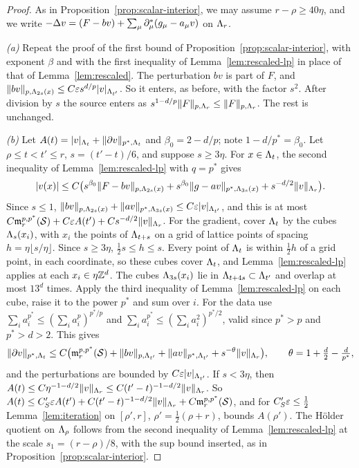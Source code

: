 \begin{proof}
As in Proposition~\ref{prop:scalar-interior}, we may assume $r-\rho\ge40\eta$, and we write $-\Delta v=(F-bv)+\sum_\mu\partial^*_\mu(g_\mu-a_\mu v)$ on $\Lambda_r$.

\emph{(a)} Repeat the proof of the first bound of Proposition~\ref{prop:scalar-interior}, with exponent $\beta$ and with the first inequality of Lemma~\ref{lem:rescaled-lp} in place of that of Lemma~\ref{lem:rescaled}. The perturbation $bv$ is part of $F$, and $\|bv\|_{p,\Lambda_{2s}(x)}\le C\varepsilon s^{d/p}|v|_{\Lambda_{t'}}$. So it enters, as before, with the factor $s^2$. After division by $s$ the source enters as $s^{1-d/p}\|F\|_{p,\Lambda_r}\le\|F\|_{p,\Lambda_r}$. The rest is unchanged.

\emph{(b)} Let $A(t)=|v|_{\Lambda_t}+\|\partial v\|_{p^*,\Lambda_t}$ and $\beta_0=2-d/p$; note $1-d/p^*=\beta_0$. Let $\rho\le t<t'\le r$, $s=(t'-t)/6$, and suppose $s\ge3\eta$. For $x\in\Lambda_t$, the second inequality of Lemma~\ref{lem:rescaled-lp} with $q=p^*$ gives
\[
|v(x)|\le C\big(s^{\beta_0}\|F-bv\|_{p,\Lambda_{2s}(x)}+s^{\beta_0}\|g-av\|_{p^*,\Lambda_{3s}(x)}+s^{-d/2}\|v\|_{\Lambda_r}\big).
\]
Since $s\le1$, $\|bv\|_{p,\Lambda_{2s}(x)}+\|av\|_{p^*,\Lambda_{3s}(x)}\le C\varepsilon|v|_{\Lambda_{t'}}$, and this is at most $C\mathfrak m^{p,p^*}_r(\mathcal S)+C\varepsilon A(t')+Cs^{-d/2}\|v\|_{\Lambda_r}$. For the gradient, cover $\Lambda_t$ by the cubes $\Lambda_s(x_i)$, with $x_i$ the points of $\Lambda_{t+s}$ on a grid of lattice points of spacing $h=\eta\lfloor s/\eta\rfloor$. Since $s\ge3\eta$, $\frac12s\le h\le s$. Every point of $\Lambda_t$ is within $\frac12h$ of a grid point, in each coordinate, so these cubes cover $\Lambda_t$, and Lemma~\ref{lem:rescaled-lp} applies at each $x_i\in\eta\mathbb Z^d$. The cubes $\Lambda_{3s}(x_i)$ lie in $\Lambda_{t+4s}\subset\Lambda_{t'}$ and overlap at most $13^d$ times. Apply the third inequality of Lemma~\ref{lem:rescaled-lp} on each cube, raise it to the power $p^*$ and sum over $i$. For the data use $\sum_ia_i^{p^*}\le(\sum_ia_i^p)^{p^*/p}$ and $\sum_ia_i^{p^*}\le(\sum_ia_i^2)^{p^*/2}$, valid since $p^*>p$ and $p^*>d>2$. This gives
\[
\|\partial v\|_{p^*,\Lambda_t}\le C\big(\mathfrak m^{p,p^*}_r(\mathcal S)+\|bv\|_{p,\Lambda_{t'}}+\|av\|_{p^*,\Lambda_{t'}}+s^{-\theta}\|v\|_{\Lambda_r}\big),\qquad\theta=1+\tfrac d2-\tfrac d{p^*},
\]
and the perturbations are bounded by $C\varepsilon|v|_{\Lambda_{t'}}$. If $s<3\eta$, then $A(t)\le C\eta^{-1-d/2}\|v\|_{\Lambda_r}\le C(t'-t)^{-1-d/2}\|v\|_{\Lambda_r}$. So $A(t)\le C_S'\varepsilon A(t')+C(t'-t)^{-1-d/2}\|v\|_{\Lambda_r}+C\mathfrak m^{p,p^*}_r(\mathcal S)$, and for $C_S'\varepsilon\le\frac12$ Lemma~\ref{lem:iteration} on $[\rho',r]$, $\rho'=\frac12(\rho+r)$, bounds $A(\rho')$. The H\"older quotient on $\Lambda_\rho$ follows from the second inequality of Lemma~\ref{lem:rescaled-lp} at the scale $s_1=(r-\rho)/8$, with the sup bound inserted, as in Proposition~\ref{prop:scalar-interior}.
\end{proof}

